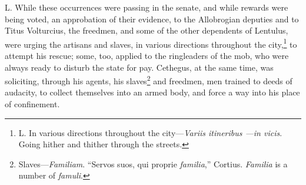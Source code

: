L. While these occurrences were passing in the senate, and while
rewards were being voted, an approbation of their evidence, to the
Allobrogian deputies and to Titus Volturcius, the freedmen, and some
of the other dependents of Lentulus, were urging the artisans and
slaves, in various directions throughout the city,\footnote{L. In various directions throughout the city—\emph{Variis itineribus
—in vicis}. Going hither and thither through the streets.} to attempt his
rescue; some, too, applied to the ringleaders of the mob, who were
always ready to disturb the state for pay. Cethegus, at the same time,
was soliciting, through his agents, his slaves\footnote{Slaves—\emph{Familiam}. ``Servos suos, qui proprie \emph{familia},''
Cortius. \emph{Familia} is a number of \emph{famuli}.} and freedmen, men
trained to deeds of audacity, to collect themselves into an armed
body, and force a way into his place of confinement.

